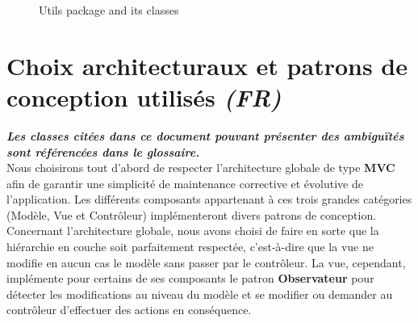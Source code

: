 \documentclass[paper=a4,fontsize=11pt]{report}
\numberwithin{equation}{section}		%
\numberwithin{figure}{section}		%
\numberwithin{table}{section}		%
\renewcommand{\bf}[1]{\textbf{#1}}
\renewcommand{\it}[1]{\textit{#1}}
\newcommand{\bfit}[1]{\textbf{\textit{#1}}}
\begin{document}
\begin{figure}[H]
\centering
\noindent{}
\caption{Utils package and its classes}
\end{figure}

\section{Choix architecturaux et patrons de conception utilisés \it{(FR)}}
\label{sec:choix-architecturaux-et-patrons-de-conception-utilises}

\bfit{Les classes citées dans ce document pouvant présenter des ambiguïtés sont référencées dans le glossaire.} \\

Nous choisirons tout d'abord de respecter l'architecture globale de type \bf{MVC} afin de garantir une simplicité de maintenance corrective et évolutive de l'application. Les différents composants appartenant à ces trois grandes catégories (Modèle, Vue et Contrôleur) implémenteront divers patrons de conception. \\

Concernant l'architecture globale, nous avons choisi de faire en sorte que la hiérarchie en couche soit parfaitement respectée, c'est-à-dire que la vue ne modifie en aucun cas le modèle sans  passer par le contrôleur. La vue, cependant, implémente pour certains de ses composants le patron \bf{Observateur} pour détecter les modifications au niveau du modèle et se modifier ou demander au contrôleur d'effectuer des actions en conséquence.\\
\end{document}
